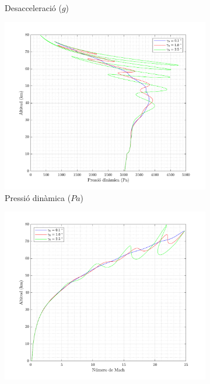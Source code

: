 \begin{figure}[ht]
\begin{subfigure}[t]{.33\textwidth}
        \caption{Desacceleració ($g$)}
    \end{subfigure}%
    \begin{subfigure}[t]{.33\textwidth}
        \centering
        \includegraphics[width=\linewidth]{imagenes/02_lifting_graficas/pressio_dinamica_no_title.pdf}
        \caption{Pressió dinàmica ($Pa$)}
    \end{subfigure}%
    \begin{subfigure}[t]{.33\textwidth}
        \centering
        \includegraphics[width=\linewidth]{imagenes/02_lifting_graficas/mach_no_title.pdf}

\end{subfigure}
\end{figure}
